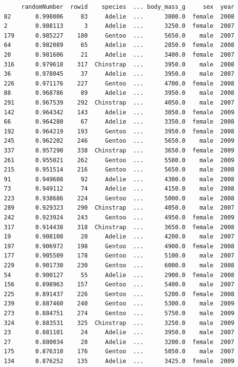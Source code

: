 \documentclass[
  letterpaper,
  DIV=11,
  numbers=noendperiod]{scrreprt}
\begin{document}
\begin{verbatim}
     randomNumber  rowid    species  ... body_mass_g     sex  year
82       0.998006     83     Adelie  ...      3800.0  female  2008
2        0.988113      3     Adelie  ...      3250.0  female  2007
179      0.985227    180     Gentoo  ...      5650.0    male  2007
64       0.982089     65     Adelie  ...      2850.0  female  2008
20       0.981606     21     Adelie  ...      3400.0  female  2007
316      0.979618    317  Chinstrap  ...      3950.0    male  2008
36       0.978045     37     Adelie  ...      3950.0    male  2007
226      0.971176    227     Gentoo  ...      4700.0  female  2008
88       0.968786     89     Adelie  ...      3950.0    male  2008
291      0.967539    292  Chinstrap  ...      4050.0    male  2007
142      0.964342    143     Adelie  ...      3050.0  female  2009
66       0.964280     67     Adelie  ...      3350.0  female  2008
192      0.964219    193     Gentoo  ...      3950.0  female  2008
245      0.962202    246     Gentoo  ...      5650.0    male  2009
337      0.957290    338  Chinstrap  ...      3650.0  female  2009
261      0.955021    262     Gentoo  ...      5500.0    male  2009
215      0.951514    216     Gentoo  ...      5650.0    male  2008
91       0.949608     92     Adelie  ...      4300.0    male  2008
73       0.949112     74     Adelie  ...      4150.0    male  2008
223      0.938686    224     Gentoo  ...      5000.0    male  2008
289      0.929323    290  Chinstrap  ...      4050.0    male  2007
242      0.923924    243     Gentoo  ...      4950.0  female  2009
317      0.914438    318  Chinstrap  ...      3650.0  female  2008
19       0.908108     20     Adelie  ...      4200.0    male  2007
197      0.906972    198     Gentoo  ...      4900.0  female  2008
177      0.905509    178     Gentoo  ...      5100.0    male  2007
229      0.901730    230     Gentoo  ...      6000.0    male  2008
54       0.900127     55     Adelie  ...      2900.0  female  2008
156      0.898963    157     Gentoo  ...      5400.0    male  2007
225      0.891437    226     Gentoo  ...      5200.0  female  2008
239      0.887460    240     Gentoo  ...      5300.0    male  2009
273      0.884751    274     Gentoo  ...      5750.0    male  2009
324      0.883531    325  Chinstrap  ...      3250.0    male  2009
23       0.881101     24     Adelie  ...      3950.0    male  2007
27       0.880034     28     Adelie  ...      3200.0  female  2007
175      0.876310    176     Gentoo  ...      5050.0    male  2007
134      0.876252    135     Adelie  ...      3425.0  female  2009

\end{verbatim}
\end{document}
